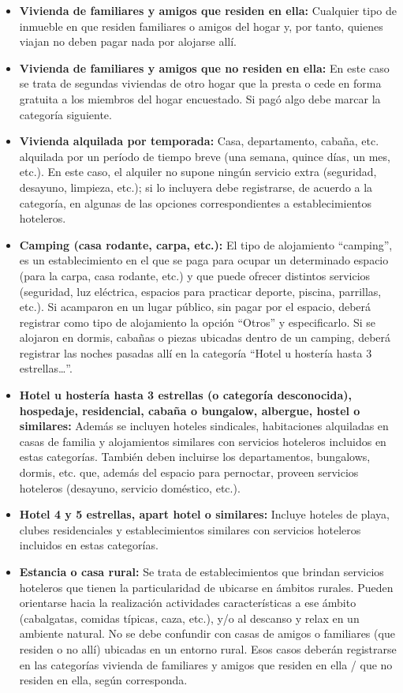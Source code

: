 \documentclass[
  openany]{book}
\begin{document}
\begin{itemize}
\item
  \textbf{Vivienda de familiares y amigos que residen en ella:} Cualquier tipo de inmueble en que residen familiares o amigos del hogar y, por tanto, quienes viajan no deben pagar nada por alojarse allí.
\item
  \textbf{Vivienda de familiares y amigos que no residen en ella:} En este caso se trata de segundas viviendas de otro hogar que la presta o cede en forma gratuita a los miembros del hogar encuestado. Si pagó algo debe marcar la categoría siguiente.
\item
  \textbf{Vivienda alquilada por temporada:} Casa, departamento, cabaña, etc. alquilada por un período de tiempo breve (una semana, quince días, un mes, etc.). En este caso, el alquiler no supone ningún servicio extra (seguridad, desayuno, limpieza, etc.); si lo incluyera debe registrarse, de acuerdo a la categoría, en algunas de las opciones correspondientes a establecimientos hoteleros.
\item
  \textbf{Camping (casa rodante, carpa, etc.):} El tipo de alojamiento ``camping'', es un establecimiento en el que se paga para ocupar un determinado espacio (para la carpa, casa rodante, etc.) y que puede ofrecer distintos servicios (seguridad, luz eléctrica, espacios para practicar deporte, piscina, parrillas, etc.). Si acamparon en un lugar público, sin pagar por el espacio, deberá registrar como tipo de alojamiento la opción ``Otros'' y especificarlo. Si se alojaron en dormis, cabañas o piezas ubicadas dentro de un camping, deberá registrar las noches pasadas allí en la categoría ``Hotel u hostería hasta 3 estrellas\ldots{}''.
\item
  \textbf{Hotel u hostería hasta 3 estrellas (o categoría desconocida), hospedaje, residencial, cabaña o bungalow, albergue, hostel o similares:} Además se incluyen hoteles sindicales, habitaciones alquiladas en casas de familia y alojamientos similares con servicios hoteleros incluidos en estas categorías. También deben incluirse los departamentos, bungalows, dormis, etc. que, además del espacio para pernoctar, proveen servicios hoteleros (desayuno, servicio doméstico, etc.).
\item
  \textbf{Hotel 4 y 5 estrellas, apart hotel o similares:} Incluye hoteles de playa, clubes residenciales y establecimientos similares con servicios hoteleros incluidos en estas categorías.
\item
  \textbf{Estancia o casa rural:} Se trata de establecimientos que brindan servicios hoteleros que tienen la particularidad de ubicarse en ámbitos rurales. Pueden orientarse hacia la realización actividades características a ese ámbito (cabalgatas, comidas típicas, caza, etc.), y/o al descanso y relax en un ambiente natural. No se debe confundir con casas de amigos o familiares (que residen o no allí) ubicadas en un entorno rural. Esos casos deberán registrarse en las categorías vivienda de familiares y amigos que residen en ella / que no residen en ella, según corresponda.

\end{itemize}
\end{document}
